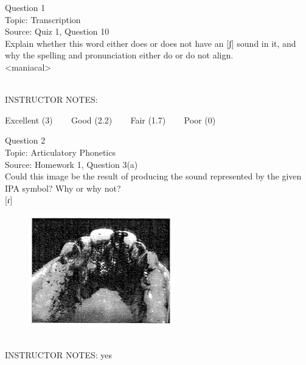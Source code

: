 \documentclass[12pt]{article}
\begin{document}
\begin{center}
\textbf{{\color{blue}{\HUGE START OF EXAM\\}}}

\textbf{{\color{blue}{\HUGE Student ID: 40575\\}}}

\textbf{{\color{blue}{\HUGE \\}}}

\end{center}
\newpage

{\large Question 1}\\

Topic: Transcription\\
Source: Quiz 1, Question 10\\

Explain whether this word either does or does not have an [ʃ] sound in it, and why the spelling and pronunciation either do or do not align.\\

<maniacal>


~\\
INSTRUCTOR NOTES: 


\vfill
Excellent (3) ~~~ Good (2.2) ~~~ Fair (1.7) ~~~ Poor (0)
\newpage

{\large Question 2}\\

Topic: Articulatory Phonetics\\
Source: Homework 1, Question 3(a)\\

Could this image be the result of producing the sound represented by the given IPA symbol? Why or why not?\\

{[ɾ]}

\begin{figure}[H]
\includegraphics{../images/staticpalatography_stop.png}
\end{figure}

~\\
INSTRUCTOR NOTES: yes
\end{document}
